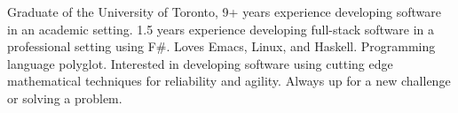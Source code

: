 

\begin{cvparagraph}

  Graduate of the University of Toronto, 9+ years experience developing software
  in an academic setting. 1.5 years experience developing full-stack software in
  a professional setting using F\#. Loves Emacs, Linux, and Haskell. Programming
  language polyglot. Interested in developing software using cutting edge
  mathematical techniques for reliability and agility. Always up for a new
  challenge or solving a problem.
\end{cvparagraph}
